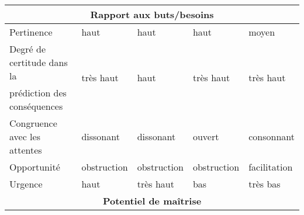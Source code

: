 \begin{table}[tbp]
\begin{tabular}{|l|l|l|l|l|}
\multicolumn{5}{|c|}{\textbf{Rapport aux buts/besoins}}                                                                                                                                                                                                                                   \\ \hline
Pertinence                                            & haut                                                       & haut                                                & haut                                                     & moyen                                               \\ \hline
Degré de certitude dans la                            & \multirow{2}{*}{très haut}                                 & \multirow{2}{*}{haut}                               & \multirow{2}{*}{très haut}                               & \multirow{2}{*}{très haut}                          \\
prédiction des conséquences                           &                                                            &                                                     &                                                          &                                                     \\ \hline
Congruence avec les attentes                          & dissonant                                                  & dissonant                                           & ouvert                                                   & consonnant                                          \\ \hline
Opportunité                                           & obstruction                                                & obstruction                                         & obstruction                                              & facilitation                                        \\ \hline
Urgence                                               & haut                                                       & très haut                                           & bas                                                      & très bas                                            \\ \hline
\multicolumn{5}{|c|}{\textbf{Potentiel de maîtrise}}                                                                                                                                                                                                                                      \\ \hline

\end{tabular}
\end{table}
